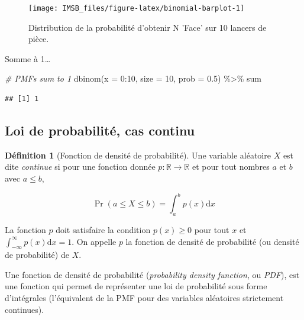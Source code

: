 \documentclass[
  a4paper,11pt,twoside,onecolumn,openright,final,oldfontcommands]{memoir}
\newenvironment{Shaded}{\begin{snugshade}}{\end{snugshade}}
\newcommand{\AttributeTok}[1]{\textcolor[rgb]{0.77,0.63,0.00}{#1}}
\newcommand{\CommentTok}[1]{\textcolor[rgb]{0.56,0.35,0.01}{\textit{#1}}}
\newcommand{\DecValTok}[1]{\textcolor[rgb]{0.00,0.00,0.81}{#1}}
\newcommand{\FloatTok}[1]{\textcolor[rgb]{0.00,0.00,0.81}{#1}}
\newcommand{\FunctionTok}[1]{\textcolor[rgb]{0.00,0.00,0.00}{#1}}
\newcommand{\NormalTok}[1]{#1}
\newcommand{\SpecialCharTok}[1]{\textcolor[rgb]{0.00,0.00,0.00}{#1}}
\theoremstyle{definition}
\newtheorem{definition}{Définition}[chapter]
\theoremstyle{definition}
\theoremstyle{definition}
\theoremstyle{definition}
\theoremstyle{remark}
\begin{document}
\begin{figure}[!htb]

{\centering \texttt{[image: IMSB\_files/figure-latex/binomial-barplot-1]} 

}

\caption{Distribution de la probabilité d'obtenir N 'Face' sur 10 lancers de pièce.}\label{fig:binomial-barplot}
\end{figure}

Somme à 1\ldots{}

\begin{Shaded}
\begin{Highlighting}[]
\CommentTok{\# PMFs sum to 1}
\FunctionTok{dbinom}\NormalTok{(}\AttributeTok{x =} \DecValTok{0}\SpecialCharTok{:}\DecValTok{10}\NormalTok{, }\AttributeTok{size =} \DecValTok{10}\NormalTok{, }\AttributeTok{prob =} \FloatTok{0.5}\NormalTok{) }\SpecialCharTok{\%\textgreater{}\%}\NormalTok{ sum}
\end{Highlighting}
\end{Shaded}

\begin{verbatim}
## [1] 1
\end{verbatim}

\hypertarget{loi-de-probabilituxe9-cas-continu}{%
\subsection{Loi de probabilité, cas continu}\label{loi-de-probabilituxe9-cas-continu}}

\begin{definition}[Fonction de densité de probabilité]
\protect\hypertarget{def:PDF}{}\label{def:PDF}Une variable aléatoire \(X\) est dite \emph{continue} si pour une fonction donnée \(p : \mathbb{R} \rightarrow \mathbb{R}\) et pour tout nombres \(a\) et \(b\) avec \(a \leq b\),

\[\Pr(a \leq X \leq b) = \int_{a}^{b} p(x) \mathrm{d} x\]

La fonction \(p\) doit satisfaire la condition \(p(x) \geq 0\) pour tout \(x\) et \(\int_{-\infty}^{\infty} p(x) \mathrm{d} x = 1\). On appelle \(p\) la fonction de densité de probabilité (ou densité de probabilité) de \(X\).
\end{definition}

Une fonction de densité de probabilité (\emph{probability density function}, ou \emph{PDF}), est une fonction qui permet de représenter une loi de probabilité sous forme d'intégrales (l'équivalent de la PMF pour des variables aléatoires strictement continues).
\end{document}
